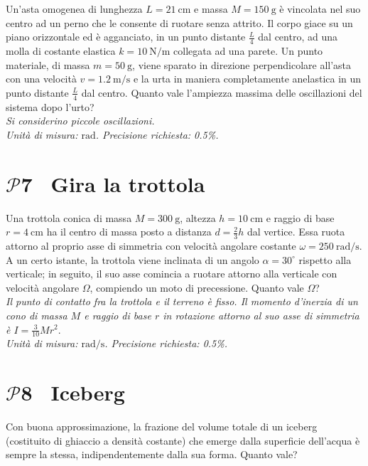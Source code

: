 \documentclass[a4paper,12pt]{article}
\newcommand{\problemtitle}[1]{
  \noindent
  \textbf{\Large #1}\hspace{0.5em}
  \raisebox{0.6ex}{\rule{\linewidth - \widthof{\textbf{\Large #1}} - 0.6em}{0.4pt}}%
}
\begin{document}
\begin{minipage}[c]{0.6\textwidth}
Un'asta omogenea di lunghezza $L = \SI{21}{\centi\meter}$ e massa $M = \SI{150}{\gram}$ è vincolata nel suo centro ad un perno che le consente di ruotare senza attrito. Il corpo giace su un piano orizzontale ed è agganciato, in un punto distante $\frac{L}{4}$ dal centro, ad una molla di costante elastica $k = \SI{10}{\newton\per\meter}$ collegata ad una parete. Un punto materiale, di massa $m = \SI{50}{\gram}$, viene sparato in direzione perpendicolare all'asta con una velocità $v = \SI{1.2}{\meter\per\second}$ e la urta in maniera completamente anelastica in un punto distante $\frac{L}{4}$ dal centro. Quanto vale l'ampiezza massima delle oscillazioni del sistema dopo l'urto? \\
\noindent
\textit{Si considerino piccole oscillazioni.} \\


\textit{Unità di misura: $\si{\radian}$. Precisione richiesta: 0.5\%.}

\end{minipage}
\section*{\problemtitle{$\mathcal{P}${\small{7}} \, Gira la trottola}}

Una trottola conica di massa \(M = \SI{300}{\gram}\), altezza \(h = \SI{10}{\centi\meter}\) e raggio di base \(r = \SI{4}{\centi\meter}\) ha il centro di massa posto a distanza $d = \frac{2}{3}h $ dal vertice. Essa ruota attorno al proprio asse di simmetria con velocità angolare costante \(\omega = \SI{250}{\radian\per\second}\). A un certo istante, la trottola viene inclinata di un angolo $\alpha = 30^\circ$ rispetto alla verticale; in seguito, il suo asse comincia a ruotare attorno alla verticale con velocità angolare $\Omega$, compiendo un moto di precessione. Quanto vale $\Omega$?\\
\noindent
\textit{Il punto di contatto fra la trottola e il terreno è fisso. Il momento d'inerzia di un cono di massa $M$ e raggio di base $r$ in rotazione attorno al suo asse di simmetria è $I = \frac{3}{10}Mr^2$}.\\

\textit{Unità di misura: $\si{\radian\per\second}$. Precisione richiesta: 0.5\%.}



\section*{\problemtitle{$\mathcal{P}${\small{8}} \, Iceberg}}
Con buona approssimazione, la frazione del volume totale di un iceberg (costituito di ghiaccio a densità costante) che emerge dalla superficie dell'acqua è sempre la stessa, indipendentemente dalla sua forma. Quanto vale? \\
\end{document}
